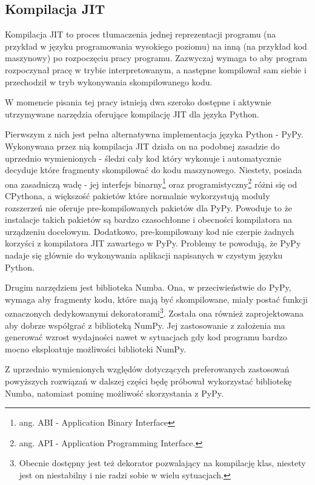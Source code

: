 \documentclass[11pt, a4paper]{article}
\begin{document}
\begin{sloppypar}
    \subsection{Kompilacja JIT}


    Kompilacja JIT to proces tłumaczenia jednej reprezentacji programu (na przykład w języku
    programowania wysokiego poziomu) na inną (na przykład kod maszynowy) po rozpoczęciu
    pracy programu. Zazwyczaj wymaga to aby program rozpoczynał pracę w trybie interpretowanym,
    a następne kompilował sam siebie i przechodził w tryb wykonywania skompilowanego
    kodu.

    W momencie pisania tej pracy istnieją dwa szeroko dostępne i aktywnie utrzymywane
    narzędzia oferujące kompilację JIT dla języka Python.

    Pierwszym z nich jest pełna alternatywna implementacja języka Python - PyPy\cite{PyPy_Home_Page}.
    Wykonywana przez nią kompilacja JIT działa on na podobnej zasadzie do uprzednio
    wymienionych - śledzi cały kod który wykonuje i automatycznie decyduje które
    fragmenty skompilować do kodu maszynowego\cite{PyPy_JIT}. Niestety, posiada ona zasadniczą
    wadę - jej interfejs binarny\footnote{ang. ABI - Application Binary Interface} oraz
    programistyczny\footnote{ang. API - Application Programming Interface.} różni się od
    CPythona, a większość pakietów które normalnie wykorzystują moduły rozszerzeń nie oferuje
    pre-kompilowanych pakietów dla PyPy. Powoduje to że instalacje takich pakietów są
    bardzo czasochłonne i obecności kompilatora na urządzeniu docelowym. Dodatkowo, pre-kompilowany
    kod nie czerpie żadnych korzyści z kompilatora JIT zawartego w PyPy. Problemy te powodują,
    że PyPy nadaje się głównie do wykonywania aplikacji napisanych w czystym języku
    Python.

    Drugim narzędziem jest biblioteka Numba\cite{Numba_Article}\cite{Numba_Doc}. Ona, w
    przeciwieństwie do PyPy, wymaga aby fragmenty kodu, które mają być skompilowane, miały
    postać funkcji oznaczonych dedykowanymi dekoratorami\footnote{Obecnie dostępny jest
    też dekorator pozwalający na kompilację klas, niestety jest on niestabilny i nie radzi
    sobie w wielu sytuacjach.}. Została ona również zaprojektowana aby dobrze współgrać
    z biblioteką NumPy. Jej zastosowanie z założenia ma generować wzrost wydajności nawet
    w sytuacjach gdy kod programu bardzo mocno eksploatuje możliwości biblioteki NumPy.

    Z uprzednio wymienionych względów dotyczących preferowanych zastosowań powyższych rozwiązań
    w dalszej części będę próbował wykorzystać bibliotekę Numba, natomiast pominę
    możliwość skorzystania z PyPy.


\end{sloppypar}
\end{document}
